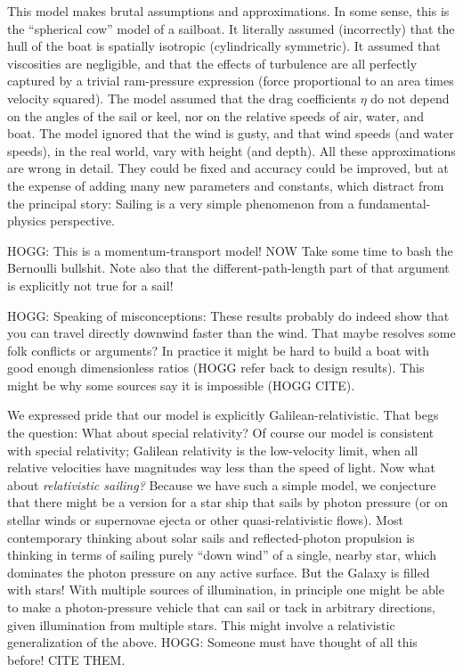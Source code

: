 \documentclass[letterpaper]{article}
\begin{document}
This model makes brutal assumptions and approximations.
In some sense, this is the ``spherical cow'' model of a sailboat.
It literally assumed (incorrectly) that the hull of the boat is spatially isotropic (cylindrically symmetric).
It assumed that viscosities are negligible, and that the effects of turbulence are all perfectly captured by a trivial ram-pressure expression (force proportional to an area times velocity squared).
The model assumed that the drag coefficients $\eta$ do not depend on the angles of the sail or keel, nor on the relative speeds of air, water, and boat.
The model ignored that the wind is gusty, and that wind speeds (and water speeds), in the real world, vary with height (and depth).
All these approximations are wrong in detail.
They could be fixed and accuracy could be improved, but at the expense of adding many new parameters and constants, which distract from the principal story:
Sailing is a very simple phenomenon from a fundamental-physics perspective.

HOGG: This is a momentum-transport model! NOW Take some time to bash the Bernoulli bullshit. Note also that the different-path-length part of that argument is explicitly not true for a sail!

HOGG: Speaking of misconceptions: These results probably do indeed show that you can travel directly downwind faster than the wind. That maybe resolves some folk conflicts or arguments?
In practice it might be hard to build a boat with good enough dimensionless ratios (HOGG refer back to design results).
This might be why some sources say it is impossible (HOGG CITE).

We expressed pride that our model is explicitly Galilean-relativistic.
That begs the question: What about special relativity?
Of course our model is consistent with special relativity; Galilean relativity is the low-velocity limit, when all relative velocities have magnitudes way less than the speed of light.
Now what about \emph{relativistic sailing?}
Because we have such a simple model, we conjecture that there might be a version for a star ship that sails by photon pressure (or on stellar winds or supernovae ejecta or other quasi-relativistic flows).
Most contemporary thinking about solar sails and reflected-photon propulsion is thinking in terms of sailing purely ``down wind'' of a single, nearby star, which dominates the photon pressure on any active surface.
But the Galaxy is filled with stars!
With multiple sources of illumination, in principle one might be able to make a photon-pressure vehicle that can sail or tack in arbitrary directions, given illumination from multiple stars.
This might involve a relativistic generalization of the above.
HOGG: Someone must have thought of all this before! CITE THEM.
\end{document}
